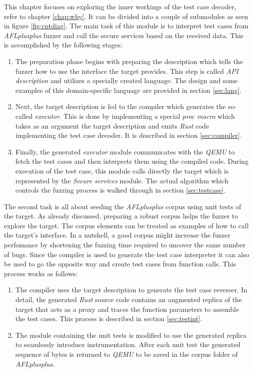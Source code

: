 This chapter focuses on exploring the inner workings of the test case decoder, refer to chapter \ref{chap:why}. It can be divided into a couple of submodules as seen in figure \ref{fig:cntdiag}. The main task of this module is to interpret test cases from \textit{AFLplusplus} fuzzer and call the secure services based on the received data. This is accomplished by the following stages:
\begin{enumerate}
    \item The preparation phase begins with preparing the description which tells the fuzzer how to use the interface the target provides. This step is called \textit{API description} and utilizes a specially created language. The design and some examples of this domain-specific language are provided in section \ref{sec:lang}.
    \item Next, the target description is fed to the compiler which generates the so-called \textit{executor}. This is done by implementing a special \textit{proc macro} which takes as an argument the target description and emits \textit{Rust} code implementing the test case decoder. It is described in section \ref{sec:compiler}.
    \item Finally, the generated \textit{executor} module communicates with the \textit{QEMU} to fetch the test cases and then interprets them using the compiled code. During execution of the test case, this module calls directly the target which is represented by the \textit{Secure services} module. The actual algorithm which controls the fuzzing process is walked through in section \ref{sec:testcase}.
\end{enumerate}
The second task is all about seeding the \textit{AFLplusplus} corpus using unit tests of the target. As already discussed, preparing a robust corpus helps the fuzzer to explore the target. The corpus elements can be treated as examples of how to call the target's interface. In a nutshell, a good corpus might increase the fuzzer perfomance by shortening the fuzzing time required to uncover the same number of bugs. Since the compiler is used to generate the test case interpreter it can also be used to go the opposite way and create test cases from function calls. This process works as follows:
\begin{enumerate}
    \item The compiler uses the target description to generate the test case reverser. In detail, the generated \textit{Rust} source code contains an augmented replica of the target that acts as a proxy and traces the function parameters to assemble the test cases. This process is described in section \ref{sec:testint}.
    \item The module containing the unit tests is modified to use the generated replica to seamlessly introduce instrumentation. After each unit test the generated sequence of bytes is returned to \textit{QEMU} to be saved in the corpus folder of \textit{AFLplusplus}.
\end{enumerate}
